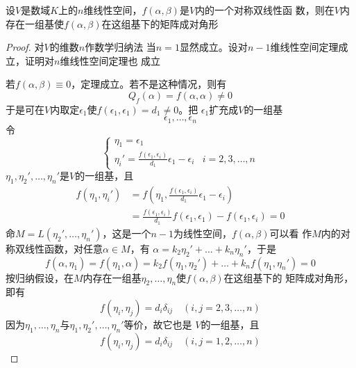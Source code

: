 \documentclass[11pt]{article}
\begin{document}
\begin{theorem}[]
设\(V\)是数域\(K\)上的\(n\)维线性空间，\(f(\alpha,\beta)\)是\(V\)内的一个对称双线性函
数，则在\(V\)内存在一组基使\(f(\alpha,\beta)\)在这组基下的矩阵成对角形
\end{theorem}

\begin{proof}
\label{thm4.1.1}
对\(V\)的维数\(n\)作数学归纳法
当\(n=1\)显然成立。设对\(n-1\)维线性空间定理成立，证明对\(n\)维线性空间定理也
成立

若\(f(\alpha,\beta)\equiv0\)，定理成立。若不是这种情况，则有
\begin{equation*}
Q_f(\alpha)=f(\alpha,\alpha)\neq0
\end{equation*}
于是可在\(V\)内取定\(\epsilon_1\)使\(f(\epsilon_1,\epsilon_1)=d_1\neq0\)。把
\(\epsilon_1\)扩充成\(V\)的一组基
\begin{equation*}
\epsilon_1,\dots,\epsilon_n
\end{equation*}
令
\begin{equation*}
\begin{cases}
 \eta_1=\epsilon_1\\
 \eta_i'=\frac{f(\epsilon_1,\epsilon_i)}{d_1}\epsilon_1-\epsilon_i&i=2,3,\dots,n
\end{cases}
\end{equation*}
\(\eta_1,\eta_2',\dots,\eta_n'\)是\(V\)的一组基，且
\begin{align*}
f(\eta_1,\eta_i')&=f(\eta_1,\frac{f(\epsilon_1,\epsilon_i)}{d_1}\epsilon_1-\epsilon_i)\\
&=\frac{f(\epsilon_1,\epsilon_i)}{d_1}f(\epsilon_1,\epsilon_1)-f(\epsilon_1,\epsilon_i)=0
\end{align*}
命\(M=L(\eta_2',\dots,\eta_n')\)，这是一个\(n-1\)为线性空间，\(f(\alpha,\beta)\)可以看
作\(M\)内的对称双线性函数，对任意\(\alpha\in M\)，有
\(\alpha=k_2\eta_2'+\dots+k_n\eta_n'\)，于是
\begin{equation*}
 f(\alpha,\eta_1)=f(\eta_1,\alpha)=k_2f(\eta_1,\eta_2')+\dots+k_nf(\eta_1,\eta_n')=0
\end{equation*}
按归纳假设，在\(M\)内存在一组基\(\eta_2,\dots,\eta_n\)使\(f(\alpha,\beta)\)在这组基下的
矩阵成对角形，即有
\begin{equation*}
f(\eta_i,\eta_j)=d_{i}\delta_{ij}\quad(i,j=2,3,\dots,n)
\end{equation*}
因为\(\eta_1,\dots,\eta_n\)与\(\eta_1,\eta_2',\dots,\eta_n'\)等价，故它也是
\(V\)的一组基，且
\begin{equation*}
f(\eta_i,\eta_j)=d_i\delta_{ij}\quad(i,j=1,2,\dots,n)
\end{equation*}
\end{proof}
\end{document}

